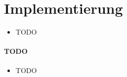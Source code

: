 
\newpage
\slidetitle{}
\section{Implementierung\\}

\begin{itemize}
	\item TODO
\end{itemize}


\newpage
{}

\paragraph{TODO\\}

\begin{itemize}
	\item TODO\\
\end{itemize}

